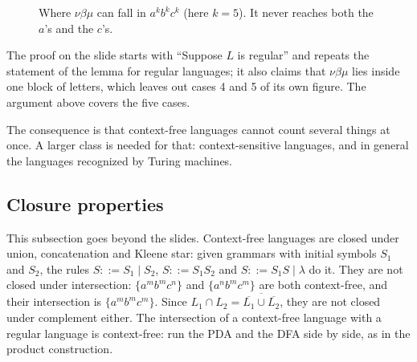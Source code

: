 \begin{figure}[h]
\centering
{}
\caption{Where $\nu\beta\mu$ can fall in $a^k b^k c^k$ (here $k = 5$). It never
reaches both the $a$'s and the $c$'s.}
\label{fig:pumping-cfl}
\end{figure}

The proof on the slide starts with ``Suppose $L$ is regular'' and repeats the
statement of the lemma for regular languages; it also claims that $\nu\beta\mu$
lies inside one block of letters, which leaves out cases 4 and 5 of its own
figure. The argument above covers the five cases.

The consequence is that context-free languages cannot count several things at
once. A larger class is needed for that: context-sensitive languages, and in
general the languages recognized by Turing machines.

\subsection{Closure properties}

This subsection goes beyond the slides. Context-free languages are closed
under union, concatenation and Kleene star: given grammars with initial
symbols $S_1$ and $S_2$, the rules $S ::= S_1 \mid S_2$, $S ::= S_1 S_2$ and
$S ::= S_1 S \mid \lambda$ do it. They are not closed under intersection:
$\{a^m b^m c^n\}$ and $\{a^n b^m c^m\}$ are both context-free, and their
intersection is $\{a^m b^m c^m\}$. Since $L_1 \cap L_2 = \overline{\overline{L_1}
\cup \overline{L_2}}$, they are not closed under complement either. The
intersection of a context-free language with a regular language is
context-free: run the PDA and the DFA side by side, as in the product
construction.

